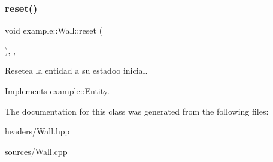 \subsubsection{\texorpdfstring{reset()}{reset()}}
{\footnotesize\ttfamily void example\+::\+Wall\+::reset (\begin{DoxyParamCaption}{ }\end{DoxyParamCaption})\hspace{0.3cm}{\ttfamily [inline]}, {\ttfamily [override]}, {\ttfamily [virtual]}}



Resetea la entidad a su estadoo inicial. 



Implements \mbox{\hyperlink{classexample_1_1_entity_a38eec21167e85013a5e89a9131458bfa}{example\+::\+Entity}}.



The documentation for this class was generated from the following files\+:\begin{DoxyCompactItemize}
\item 
headers/Wall.\+hpp\item 
sources/Wall.\+cpp\end{DoxyCompactItemize}
